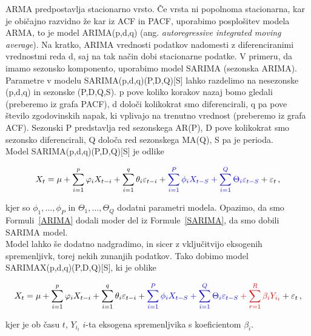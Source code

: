 \documentclass[a4paper, 11pt]{article}
\begin{document}
\noindent ARMA predpostavlja stacionarno vrsto. Če vrsta ni popolnoma stacionarna, kar je običajno razvidno 
že kar iz ACF in PACF, uporabimo posplošitev modela ARMA, to je model ARIMA(p,d,q) (ang. \emph{autoregressive integrated moving average}).
Na kratko, ARIMA vrednosti podatkov nadomesti z diferenciranimi vrednostmi reda d, saj na tak način dobi stacionarne podatke.
V primeru, da imamo sezonsko komponento, uporabimo model SARIMA (sezonska ARIMA). Parametre v modelu
SARIMA(p,d,q)(P,D,Q)[S] lahko razdelimo na nesezonske (p,d,q) in sezonske (P,D,Q,S). 
p pove koliko korakov nazaj bomo gledali (preberemo iz grafa PACF), 
d določi kolikokrat smo diferencirali,
q pa pove število zgodovinskih napak, ki vplivajo na trenutno vrednost (preberemo iz grafa ACF).
Sezonski P predstavlja red sezonskega AR(P), 
D pove kolikokrat smo sezonsko diferencirali,
Q določa red sezonskega MA(Q), 
S pa je perioda. \cite{SARIMA_param} \\

\noindent Model SARIMA(p,d,q)(P,D,Q)[S] je odlike

\begin{equation}
    \label{SARIMA}
    X_t = \mu + \sum_{i=1}^{p}{\varphi_i X_{t-i}} + \sum_{i=1}^{q}{\theta_i \varepsilon_{t-i}} + \color{blue} \sum_{i=1}^{P}{\phi_i X_{t-S}} + \sum_{i=1}^{Q}{\Theta_i \varepsilon_{t-S}}  \color{black} +  \varepsilon_t\,,
\end{equation}

\noindent kjer so $\phi_1, \dots, \phi_P$ in $\Theta_1, \dots, \Theta_Q$ dodatni parametri modela. Opazimo, da 
smo Formuli~\eqref{ARIMA} dodali moder del iz Formule~\eqref{SARIMA}, da smo dobili SARIMA model. \\

\noindent Model lahko še dodatno nadgradimo, in sicer z vključitvijo eksogenih spremenljivk, torej nekih zunanjih podatkov. Tako
dobimo model SARIMAX(p,d,q)(P,D,Q)[S], ki je oblike

\begin{equation}
    \label{SARIMAX}
    X_t = \mu + \sum_{i=1}^{p}{\varphi_i X_{t-i}} + \sum_{i=1}^{q}{\theta_i \varepsilon_{t-i}} + \color{blue} \sum_{i=1}^{P}{\phi_i X_{t-S}} + \sum_{i=1}^{Q}{\Theta_i \varepsilon_{t-S}}  \color{red}  + \sum_{r=1}^{R}{\beta_i Y_{i_{t}}} \color{black} +  \varepsilon_t\,,
\end{equation}

\noindent kjer je ob času $t$, $Y_{i_t}$ $i$-ta eksogena spremenljvika s koeficientom $\beta_i$. \cite{ARMA_ARIMA_SARIMA_SARIMAX}
\end{document}
